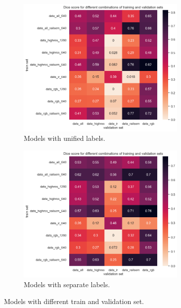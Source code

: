 \documentclass[Master,MDS,english]{BASE/twbook} %
\begin{document}
\begin{figure}
\centering
\begin{subfigure}[t]{.5\textwidth}
  \centering
  \includegraphics[width=0.9\textwidth]{images/yolo/models}
  \caption{Models with unified labels.}
\end{subfigure}%
\begin{subfigure}[t]{.5\textwidth}
  \centering
  \includegraphics[width=0.9\textwidth]{images/yolo/models_new_label}
  \caption{Models with separate labels. }
\end{subfigure}
\caption{Models with different train and validation set.}
\label{fig:yolo_models}
\end{figure}
\end{document}

